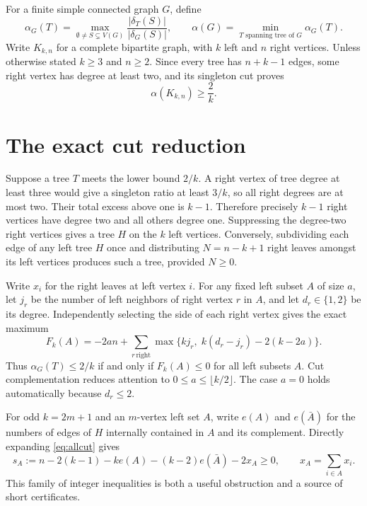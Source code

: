 \documentclass[11pt,a4paper]{article}
\newcommand{\al}{\alpha}
\newcommand{\del}{\delta}
\newcommand{\KK}[2]{K_{#1,#2}}
\begin{document}
For a finite simple connected graph $G$, define
\begin{equation}\label{eq:def}
\al_G(T)=\max_{\emptyset\ne S\subsetneq V(G)}\frac{|\del_T(S)|}{|\del_G(S)|},\qquad
\al(G)=\min_{T\text{ spanning tree of }G}\al_G(T).
\end{equation}
Write $\KK{k}{n}$ for a complete bipartite graph, with $k$ left and $n$ right vertices. Unless otherwise stated $k\ge3$ and $n\ge2$. Since every tree has $n+k-1$ edges, some right vertex has degree at least two, and its singleton cut proves
\begin{equation}\label{eq:singleton}
\al(\KK{k}{n})\ge \frac2k.
\end{equation}

\section{The exact cut reduction}
Suppose a tree $T$ meets the lower bound $2/k$. A right vertex of tree degree at least three would give a singleton ratio at least $3/k$, so all right degrees are at most two. Their total excess above one is $k-1$. Therefore precisely $k-1$ right vertices have degree two and all others degree one. Suppressing the degree-two right vertices gives a tree $H$ on the $k$ left vertices. Conversely, subdividing each edge of any left tree $H$ once and distributing $N=n-k+1$ right leaves amongst its left vertices produces such a tree, provided $N\ge0$.

Write $x_i$ for the right leaves at left vertex $i$. For any fixed left subset $A$ of size $a$, let $j_r$ be the number of left neighbors of right vertex $r$ in $A$, and let $d_r\in\{1,2\}$ be its degree. Independently selecting the side of each right vertex gives the exact maximum
\begin{equation}\label{eq:allcut}
F_k(A)=-2an+\sum_{r\,\mathrm{right}}\max\{k j_r,\;k(d_r-j_r)-2(k-2a)\}.
\end{equation}
Thus $\al_G(T)\le2/k$ if and only if $F_k(A)\le0$ for all left subsets $A$. Cut complementation reduces attention to $0\le a\le\lfloor k/2\rfloor$. The case $a=0$ holds automatically because $d_r\le2$.

For odd $k=2m+1$ and an $m$-vertex left set $A$, write $e(A)$ and $e(\bar A)$ for the numbers of edges of $H$ internally contained in $A$ and its complement. Directly expanding \eqref{eq:allcut} gives
\begin{equation}\label{eq:slack}
s_A:=n-2(k-1)-k e(A)-(k-2)e(\bar A)-2x_A\ge0,
\qquad x_A=\sum_{i\in A}x_i.
\end{equation}
This family of integer inequalities is both a useful obstruction and a source of short certificates.
\end{document}
